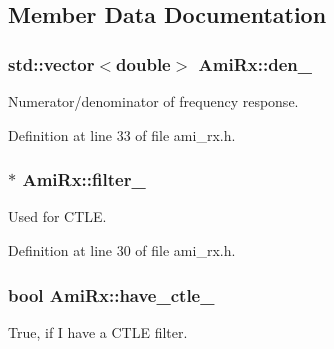 \subsection{Member Data Documentation}
\hypertarget{class_ami_rx_a9409edcb278ad096873c32df764f8939}{}
\subsubsection[{den\+\_\+}]{\setlength{\rightskip}{0pt plus 5cm}std\+::vector$<$double$>$ Ami\+Rx\+::den\+\_\+\hspace{0.3cm}{\ttfamily [protected]}}\label{class_ami_rx_a9409edcb278ad096873c32df764f8939}


Numerator/denominator of frequency response. 



Definition at line 33 of file ami\+\_\+rx.\+h.

\hypertarget{class_ami_rx_aa3e0caabcdfa0c97620a0d17cf6b559f}{}
\subsubsection[{filter\+\_\+}]{$\ast$ Ami\+Rx\+::filter\+\_\+\hspace{0.3cm}{\ttfamily [protected]}}\label{class_ami_rx_aa3e0caabcdfa0c97620a0d17cf6b559f}


Used for C\+T\+L\+E. 



Definition at line 30 of file ami\+\_\+rx.\+h.

\hypertarget{class_ami_rx_ae2840175da78615711e175b9f5019087}{}
\subsubsection[{have\+\_\+ctle\+\_\+}]{\setlength{\rightskip}{0pt plus 5cm}bool Ami\+Rx\+::have\+\_\+ctle\+\_\+\hspace{0.3cm}{\ttfamily [protected]}}\label{class_ami_rx_ae2840175da78615711e175b9f5019087}


True, if I have a C\+T\+L\+E filter. 



